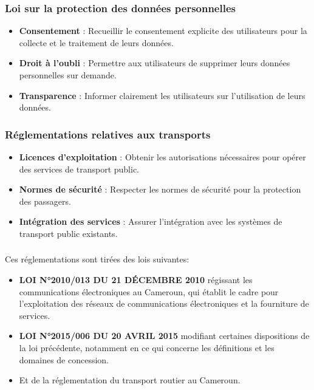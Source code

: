 \documentclass{article}
\begin{document}
\subsubsection*{Loi sur la protection des données personnelles}
\begin{itemize}
  \item \textbf{Consentement} : Recueillir le consentement explicite des utilisateurs pour la collecte et le traitement de leurs données.
  \item \textbf{Droit à l'oubli} : Permettre aux utilisateurs de supprimer leurs données personnelles sur demande.
  \item \textbf{Transparence} : Informer clairement les utilisateurs sur l'utilisation de leurs données.
\end{itemize}

\subsubsection*{Réglementations relatives aux transports}
\begin{itemize}
  \item \textbf{Licences d'exploitation} : Obtenir les autorisations nécessaires pour opérer des services de transport public.
  \item \textbf{Normes de sécurité} : Respecter les normes de sécurité pour la protection des passagers.
  \item \textbf{Intégration des services} : Assurer l'intégration avec les systèmes de transport public existants.
\end{itemize}

\subsubsection*{}
Ces réglementations sont tirées des lois suivantes:

\begin{itemize}
  \item \textbf{LOI N°2010/013 DU 21 DÉCEMBRE 2010} régissant les communications électroniques au Cameroun, qui établit le cadre pour l'exploitation des réseaux de communications électroniques et la fourniture de services.\cite{Loi2010013}
  \item \textbf{LOI N°2015/006 DU 20 AVRIL 2015} modifiant certaines dispositions de la loi précédente, notamment en ce qui concerne les définitions et les domaines de concession.\cite{cameroon_law_2015}
  \item Et de la réglementation du transport routier au Cameroun.\cite{securoute2024}
\end{itemize}
\end{document}
